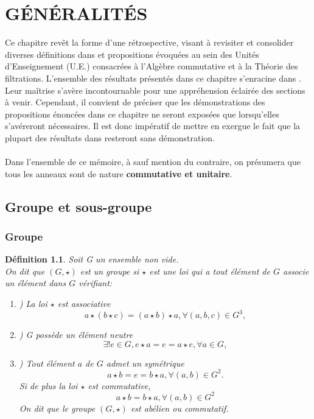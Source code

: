 \documentclass[12pt, a4paper, oneside]{book}
\newtheorem{madefinition}{Définition}[chapter]
\begin{document}
	\chapter{GÉNÉRALITÉS}
	Ce chapitre revêt la forme d'une rétrospective, visant à revisiter et consolider diverses définitions dans \cite{5} et propositions évoquées au sein des Unités d'Enseignement (U.E.) consacrées à l'Algèbre commutative et à la Théorie des filtrations. L'ensemble des résultats présentés dans ce chapitre s'enracine dans \cite{6}. Leur maîtrise s'avère incontournable pour une appréhension éclairée des sections à venir. Cependant, il convient de préciser que les démonstrations des propositions énoncées dans ce chapitre ne seront exposées que lorsqu'elles s'avéreront nécessaires. Il est donc impératif de mettre en exergue le fait que la plupart des résultats dans \cite{3} resteront sans démonstration. \\\\ Dans l'ensemble de ce mémoire, à sauf mention du contraire, on présumera que tous les anneaux sont de nature \textbf{commutative et unitaire}.
	\section{Groupe et sous-groupe}
	\subsection{Groupe}
	\begin{madefinition}
		\label{madef1}
		Soit G un ensemble non vide.\\
		On dit que $(G,\star)$ est un groupe si $\star$ est une loi qui a tout élément de $G$ associe un élément dans $G$ vérifiant:
		\begin{enumerate}
			\item[i] ) La loi $\star$ est associative 
			\[ a\star(b\star c) = (a\star b) \star a, \forall (a,b,c) \in G^3,\]
			\item[ii] ) G possède un élément neutre
			\[ \exists!e \in G, e\star a = e =  a\star e, \forall a \in G,\]
			\item[iii] ) Tout élément $a$ de $G$ admet un symétrique
			\[ a\star b = e = b \star a, \forall (a,b) \in G^2.\]
			Si de plus la loi $\star$ est commutative, 
			\[ a\star b = b \star a, \forall (a,b) \in G^2\]
			On dit que le groupe $(G,\star)$ est abélien ou commutatif.
		\end{enumerate}
	\end{madefinition}
\end{document}
